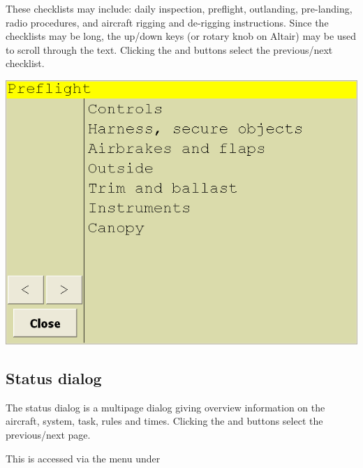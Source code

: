 \documentclass[a4paper,12pt]{refrep}
\begin{document}
These checklists may include: daily inspection, preflight, outlanding,
pre-landing, radio procedures, and aircraft rigging and de-rigging
instructions.  Since the checklists may be long, the up/down keys (or
rotary knob on Altair) may be used to scroll through the text.  Clicking
the \button{$<$} and \button{$>$} buttons select the previous/next checklist.

\begin{center}
\includegraphics[angle=0,width=\linewidth,keepaspectratio='true']{figures/checklist.png}
\end{center}

\subsection*{Status dialog}

The status dialog is a multipage dialog giving overview information on the 
aircraft, system, task, rules and times.  Clicking
the \button{$<$} and \button{$>$} buttons select the previous/next page.

This is accessed via the menu under 
\begin{quote}
\blink{}
\end{quote}
\end{document}
